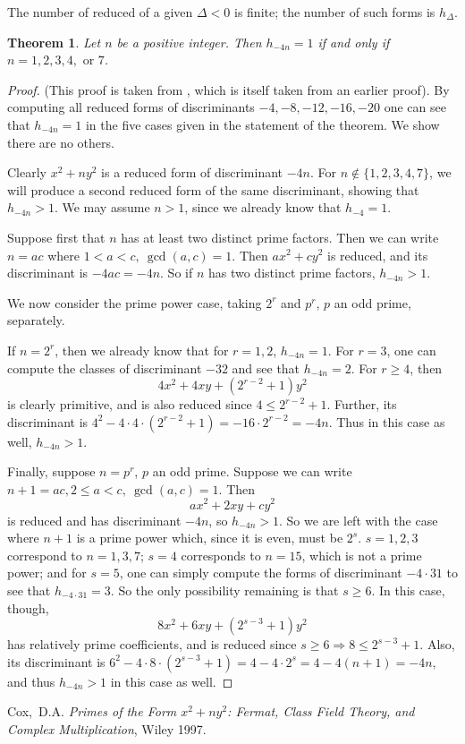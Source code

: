 \documentclass[12pt]{article}
\newtheorem{thm}{Theorem}
\theoremstyle{definition}
\begin{document}
The number of reduced  of a given  $\Delta<0$ is finite; the number of such forms is $h_{\Delta}$.

\begin{thm}Let $n$ be a positive integer. Then $h_{-4n}=1$ if and only if $n=1,2,3,4,\text{ or }7$. 
\end{thm}
\begin{proof} (This proof is taken from \cite{bib:cox}, which is itself taken from an earlier proof).
\newline
By computing all reduced forms of discriminants $-4,-8,-12,-16, -20$ one can see that $h_{-4n}=1$ in the five cases given in the statement of the theorem. We show there are no others.

Clearly $x^2+ny^2$ is a reduced form of discriminant $-4n$. For $n\notin \{1,2,3,4,7\}$, we will produce a second reduced form of the same discriminant, showing that $h_{-4n}>1$. We may assume $n>1$, since we already know that $h_{-4}=1$.

Suppose first that $n$ has at least two distinct prime factors. Then we can write $n=ac$ where $1<a<c,\ \gcd(a,c)=1$. Then $ax^2+cy^2$ is reduced, and its discriminant is $-4ac=-4n$. So if $n$ has two distinct prime factors, $h_{-4n}>1$.

We now consider the prime power case, taking $2^r$ and $p^r$, $p$ an odd prime, separately.

If $n=2^r$, then we already know that for $r=1,2$, $h_{-4n}=1$. For $r=3$, one can compute the classes of discriminant $-32$ and see that $h_{-4n}=2$. For $r\geq 4$, then
	\[4x^2+4xy+(2^{r-2}+1)y^2
\]
is clearly primitive, and is also reduced since $4\leq 2^{r-2}+1$. Further, its discriminant is $4^2-4\cdot 4\cdot(2^{r-2}+1)=-16\cdot 2^{r-2}=-4n$. Thus in this case as well, $h_{-4n}>1$.

Finally, suppose $n=p^r$, $p$ an odd prime. Suppose we can write $n+1=ac, 2\leq a<c,\ \gcd(a,c)=1$. Then
\[ax^2+2xy+cy^2\] is reduced and has discriminant $-4n$, so $h_{-4n}>1$. So we are left with the case where $n+1$ is a prime power which, since it is even, must be $2^s$. $s=1,2,3$ correspond to $n=1,3,7$; $s=4$ corresponds to $n=15$, which is not a prime power; and for $s=5$, one can simply compute the forms of discriminant $-4\cdot 31$ to see that $h_{-4\cdot 31}=3$. So the only possibility remaining is that $s\geq 6$. In this case, though,
\[8x^2+6xy+(2^{s-3}+1)y^2\]
has relatively prime coefficients, and is reduced since $s\geq 6\Rightarrow 8\leq 2^{s-3}+1$. Also, its discriminant is $6^2-4\cdot 8\cdot(2^{s-3}+1)=4-4\cdot2^s=4-4(n+1)=-4n$, and thus $h_{-4n}>1$ in this case as well.
\end{proof}

\begin{thebibliography}{10}
Cox,~D.A. \emph{Primes of the Form $x^2 + ny^2$: Fermat, Class Field Theory, and Complex Multiplication}, Wiley 1997.
\end{thebibliography}

\end{document}
